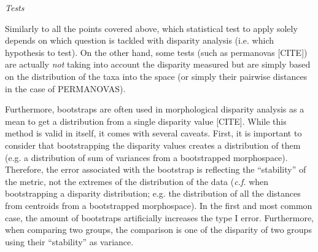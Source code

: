 \documentclass[12pt,letterpaper]{article}
\renewcommand{\subsection}[1]{%
\bigskip
\begin{center}
\begin{large}
\normalfont\itshape #1
\end{large}
\end{center}}
\begin{document}

\subsection{Tests}
Similarly to all the points covered above, which statistical test to apply solely depends on which question is tackled with disparity analysis (i.e. which hypothesis to test).
On the other hand, some tests (such as permanovas [CITE]) are actually \textit{not} taking into account the disparity measured but are simply based on the distribution of the taxa into the space (or simply their pairwise distances in the case of PERMANOVAS).

Furthermore, bootstraps are often used in morphological disparity analysis as a mean to get a distribution from a single disparity value [CITE].
While this method is valid in itself, it comes with several caveats.
First, it is important to consider that bootstrapping the disparity values creates a distribution of them (e.g. a distribution of sum of variances from a bootstrapped morphospace).
Therefore, the error associated with the bootstrap is reflecting the ``stability'' of the metric, not the extremes of the distribution of the data (\textit{c.f.} when bootstrapping a disparity distribution; e.g. the distribution of all the distances from centroids from a bootstrapped morphospace).
In the first and most common case, the amount of bootstraps artificially increases the type I error.
Furthermore, when comparing two groups, the comparison is one of the disparity of two groups using their ``stability'' as variance. 
\end{document}
